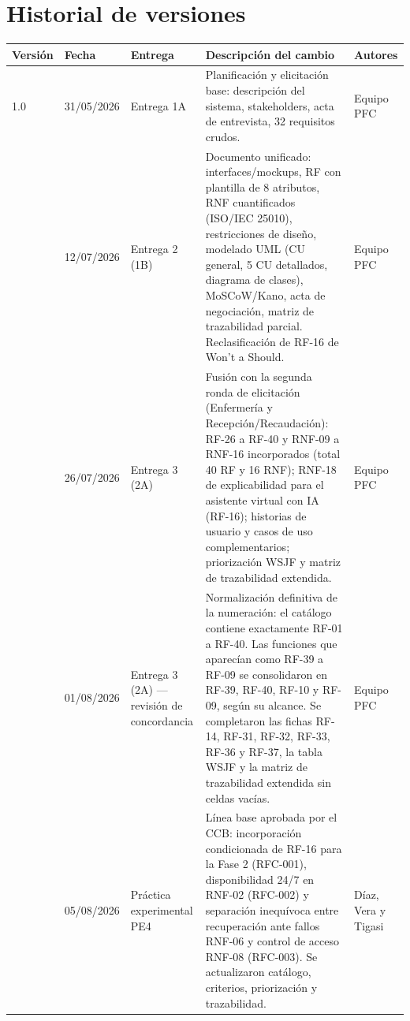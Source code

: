 \documentclass[11pt,a4paper]{article}
\begin{document}
	\section*{Historial de versiones}
	\begin{longtable}{@{}p{1.3cm}p{1.8cm}p{2.3cm}p{7.2cm}p{3cm}@{}}
		\toprule
		\textbf{Versión} & \textbf{Fecha} & \textbf{Entrega} & \textbf{Descripción del cambio} & \textbf{Autores} \\
		\midrule
		\endhead
		1.0 & 31/05/2026 & Entrega 1A & Planificación y elicitación base: descripción del sistema, stakeholders, acta de entrevista, 32 requisitos crudos. & Equipo PFC \\
		\addlinespace
		2.0 & 12/07/2026 & Entrega 2 (1B) & Documento unificado: interfaces/mockups, RF con plantilla de 8 atributos, RNF cuantificados (ISO/IEC 25010), restricciones de diseño, modelado UML (CU general, 5 CU detallados, diagrama de clases), MoSCoW/Kano, acta de negociación, matriz de trazabilidad parcial. Reclasificación de RF-16 de Won't a Should. & Equipo PFC \\
		\addlinespace
		3.0 & 26/07/2026 & Entrega 3 (2A) & Fusión con la segunda ronda de elicitación (Enfermería y Recepción/Recaudación): RF-26 a RF-40 y RNF-09 a RNF-16 incorporados (total 40 RF y 16 RNF); RNF-18 de explicabilidad para el asistente virtual con IA (RF-16); historias de usuario y casos de uso complementarios; priorización WSJF y matriz de trazabilidad extendida. & Equipo PFC \\
		\addlinespace
		3.1 & 01/08/2026 & Entrega 3 (2A) --- revisión de concordancia & Normalización definitiva de la numeración: el catálogo contiene exactamente RF-01 a RF-40. Las funciones que aparecían como RF-39 a RF-09 se consolidaron en RF-39, RF-40, RF-10 y RF-09, según su alcance. Se completaron las fichas RF-14, RF-31, RF-32, RF-33, RF-36 y RF-37, la tabla WSJF y la matriz de trazabilidad extendida sin celdas vacías. & Equipo PFC \\
		\addlinespace
		1.1 & 05/08/2026 & Práctica experimental PE4 & Línea base aprobada por el CCB: incorporación condicionada de RF-16 para la Fase 2 (RFC-001), disponibilidad 24/7 en RNF-02 (RFC-002) y separación inequívoca entre recuperación ante fallos RNF-06 y control de acceso RNF-08 (RFC-003). Se actualizaron catálogo, criterios, priorización y trazabilidad. & Díaz, Vera y Tigasi \\
		\bottomrule
	\end{longtable}
	
\end{document}
